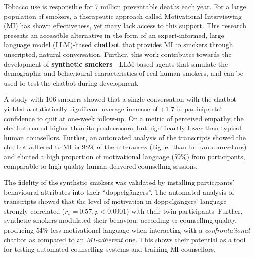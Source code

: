 Tobacco use is responsible for 7 million preventable deaths each year. For a large population of smokers, a therapeutic approach called Motivational Interviewing (MI) has shown effectiveness, yet many lack access to this support. This research presents an accessible alternative in the form of an expert-informed, large language model (LLM)-based \textbf{chatbot} that provides MI to smokers through unscripted, natural conversation. Further, this work contributes towards the development of \textbf{synthetic smokers}---LLM-based agents that simulate the demographic and behavioural characteristics of real human smokers, and can be used to test the chatbot during development.

A study with 106 smokers showed that a single conversation with the chatbot yielded a statistically significant average increase of +1.7 in participants' confidence to quit at one-week follow-up. On a metric of perceived empathy, the chatbot scored higher than its predecessors, but significantly lower than typical human counsellors. Further, an automated analysis of the transcripts showed the chatbot adhered to MI in 98\% of the utterances (higher than human counsellors) and elicited a high proportion of motivational language (59\%) from participants, comparable to high-quality human-delivered counselling sessions.

The fidelity of the synthetic smokers was validated by installing participants' behavioural attributes into their ``doppelgängers''. The automated analysis of transcripts showed that the level of motivation in doppelgängers' language strongly correlated ($r_{s}=0.57, p<0.0001$) with their twin participants. Further, synthetic smokers modulated their behaviour according to counselling quality, producing 54\% less motivational language when interacting with a \emph{confrontational} chatbot as compared to an \emph{MI-adherent} one. This shows their potential as a tool for testing automated counselling systems and training MI counsellors.